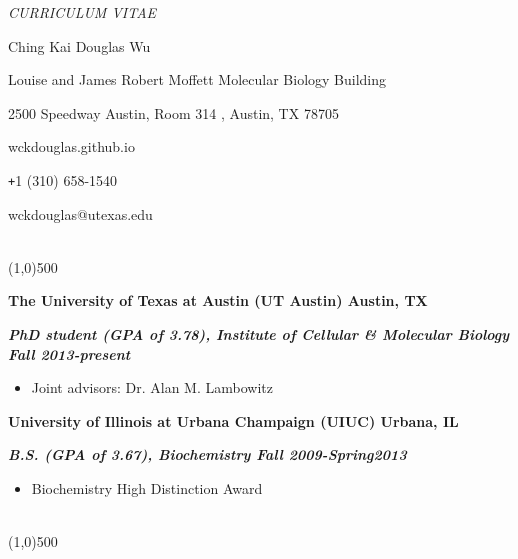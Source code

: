 \documentclass[dvips,11pt]{article}
\begin{document}
\centerline{\it \small CURRICULUM VITAE}
\vspace{2mm}
\centerline{\Large Ching Kai Douglas Wu}  
\centerline{ Louise and James Robert Moffett Molecular Biology Building}
\centerline{2500 Speedway Austin, Room 314 , Austin, TX 78705} 
\centerline{wckdouglas.github.io}
\centerline{\texttt{+}1 (310) 658-1540}
\centerline{wckdouglas@utexas.edu}
\vspace{.5mm}

 \vspace{-2mm}
\\\noindent \line(1,0){500}\\
\noindent \centerline{\bf The University of Texas at Austin (UT Austin) \hfill Austin, TX}
\noindent \centerline{\textit{\textbf{PhD student (GPA of 3.78), Institute of Cellular \& Molecular Biology \hfill Fall 2013-present}}}
\vspace{-6mm}
\begin{spacing}{0.2}
\begin{itemize} \parskip 0pt \parsep 0pt
	\setlength{\itemsep}{0pt}
	\item Joint advisors: Dr. Alan M. Lambowitz
	\end{itemize}
\end{spacing} 

\bigskip
\noindent \centerline{\bf University of Illinois at Urbana Champaign (UIUC) \hfill Urbana, IL}
\noindent \centerline{{\textit{\textbf{B.S. (GPA of 3.67), Biochemistry \hfill Fall 2009-Spring2013}}}}
\vspace{-6mm}
\begin{itemize} \itemsep 1pt \parskip 0pt \parsep 0pt
	\setlength{\itemsep}{0pt}
	\item Biochemistry High Distinction Award
	\end{itemize}
\vspace{-2mm}
\bigskip

 \vspace{-2mm}
\\\noindent
\vspace{-7mm}
\line(1,0){500}\\
\end{document}
